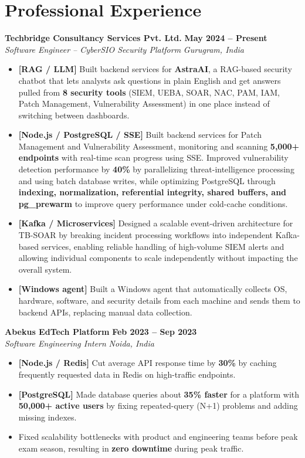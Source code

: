 \documentclass[10pt,letterpaper]{article}
\newcommand{\resumeSubheading}[4]{
    \textbf{#1} \hfill \textbf{#2}\\
    \textit{#3} \hfill \textit{#4}

}
\newcommand{\resumeItem}[1]{
    \item #1
}
\begin{document}
\section{Professional Experience}

\resumeSubheading
    {Techbridge Consultancy Services Pvt. Ltd.}
    {May 2024 -- Present}
    {Software Engineer -- CyberSIO Security Platform}
    {Gurugram, India}

\begin{itemize}
    \resumeItem{\textbf{[RAG / LLM]} Built backend services for \textbf{AstraAI}, a RAG-based security chatbot that lets analysts ask questions in plain English and get answers pulled from \textbf{8 security tools} (SIEM, UEBA, SOAR, NAC, PAM, IAM, Patch Management, Vulnerability Assessment) in one place instead of switching between dashboards.}

    \resumeItem{\textbf{[Node.js / PostgreSQL / SSE]} Built backend services for Patch Management and Vulnerability Assessment, monitoring and scanning \textbf{5,000+ endpoints} with real-time scan progress using SSE. Improved vulnerability detection performance by \textbf{40\%} by parallelizing threat-intelligence processing and using batch database writes, while optimizing PostgreSQL through \textbf{indexing, normalization, referential integrity, shared buffers, and pg\_prewarm} to improve query performance under cold-cache conditions.}

    \resumeItem{\textbf{[Kafka / Microservices]} Designed a scalable event-driven architecture for TB-SOAR by breaking incident processing workflows into independent Kafka-based services, enabling reliable handling of high-volume SIEM alerts and allowing individual components to scale independently without impacting the overall system.}

    \resumeItem{\textbf{[Windows agent]} Built a Windows agent that automatically collects OS, hardware, software, and security details from each machine and sends them to backend APIs, replacing manual data collection.}

\end{itemize}

\vspace{1pt}

\resumeSubheading
    {Abekus EdTech Platform}
    {Feb 2023 -- Sep 2023}
    {Software Engineering Intern}
    {Noida, India}

\begin{itemize}
    \resumeItem{\textbf{[Node.js / Redis]} Cut average API response time by \textbf{30\%} by caching frequently requested data in Redis on high-traffic endpoints.}

    \resumeItem{\textbf{[PostgreSQL]} Made database queries about \textbf{35\% faster} for a platform with \textbf{50,000+ active users} by fixing repeated-query (N+1) problems and adding missing indexes.}

    \resumeItem{Fixed scalability bottlenecks with product and engineering teams before peak exam season, resulting in \textbf{zero downtime} during peak traffic.}
\end{itemize}
\end{document}

